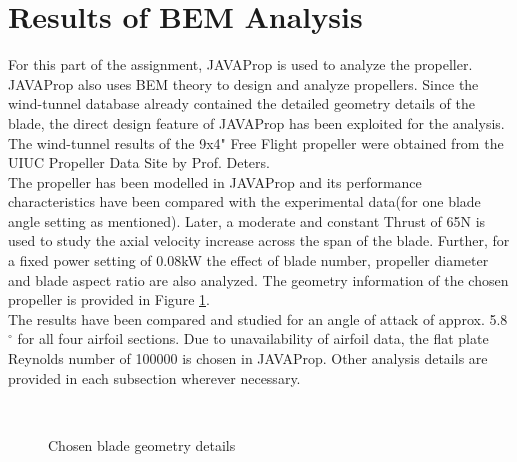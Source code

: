 \documentclass[main.tex]{subfiles}
\begin{document}
\section{Results of BEM Analysis}
For this part of the assignment, JAVAProp is used to analyze the propeller. JAVAProp also uses BEM theory to design and analyze propellers. Since the wind-tunnel database already contained the detailed geometry details of the blade, the direct design feature of JAVAProp has been exploited for the analysis. The wind-tunnel results of the 9x4" Free Flight propeller were obtained from the UIUC Propeller Data Site\cite{UIUC} by Prof. Deters\cite{deters2014reynolds}\cite{deters2014performance}.\\
\newline The propeller has been modelled in JAVAProp and its performance characteristics have been compared with the experimental data(for one blade angle setting as mentioned). Later, a moderate and constant Thrust of 65N is used to study the axial velocity increase across the span of the blade. Further, for a fixed power setting of 0.08kW the effect of blade number, propeller diameter and blade aspect ratio are also analyzed. The geometry information of the chosen propeller is provided in Figure \ref{fig4}.\\
\newline The results have been compared and studied for an angle of attack of approx. 5.8$^{\circ}$ for all four airfoil sections. Due to unavailability of airfoil data, the flat plate Reynolds number of 100000 is chosen in JAVAProp. Other analysis details are provided in each subsection wherever necessary.

\begin{figure}[h!]
    \centering
    \vspace{-1em}
    \\
    \caption{Chosen blade geometry details}
    \label{fig4}
\end{figure}
\end{document}
